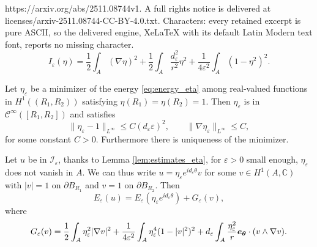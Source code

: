 \documentclass[10pt,a4paper]{amsart}
\def \p {\partial}
\def\C{{\mathcal C}}
\def\I{{\mathcal I}}
\def\e {{\varepsilon}}
\renewcommand{\vec}[1]{\text{\boldmath $#1$}}
\begin{document}
https://arxiv.org/abs/2511.08744v1. A full rights notice is delivered at licenses/arxiv-2511.08744-CC-BY-4.0.txt. Characters: every retained excerpt is pure ASCII, so the delivered engine, XeLaTeX with its default Latin Modern text font, reports no missing character.
\begin{equation}\label{eq:energy_eta}
I_\e (\eta) =\frac12 \int_A (\nabla \eta)^2+\frac12 \int_A \frac{d_\e^2}{r^2} \eta^2+\frac{1}{4\e^2}\int_A (1-\eta^2)^2.
\end{equation}

\begin{lemma}\label{lem:estimates_eta}
Let \(\eta_\e\) be a minimizer of the energy \eqref{eq:energy_eta} among real-valued functions in \(H^1((R_1,R_2))\) satisfying \(\eta(R_1)=\eta(R_2)=1\). Then \(\eta_\e\) is in \(\C^\infty([R_1,R_2])\) and satisfies
\begin{equation}\label{eq:estimate_eta}
\|\eta_\e-1\|_{L^\infty}\leq C(d_\e\e)^2, \quad \quad \| \nabla \eta_\e\|_{L^\infty}\leq C,
\end{equation}
for some constant \(C>0\). Furthermore there is uniqueness of the minimizer.
\end{lemma}

\begin{lemma}\label{lem:decomposition_energy} 
Let \(u\) be in \(\I_\e\), thanks to Lemma \ref{lem:estimates_eta}, for \(\e>0\) small enough, \(\eta_\e\) does not vanish in \(A\). We can thus write \(u=\eta_\e e^{id_\e\theta} v\) for some \(v\in H^1(A,\mathbb{C})\) with \(|v|=1\) on \(\p B_{R_1}\) and \(v=1\) on \(\p B_{R_2}\). Then
\begin{equation}\label{eq:splittinh}
E_\e(u)=E_\e(\eta_\e e^{id_\e \theta})+G_\e(v),
\end{equation} 
where 
\begin{equation*}
G_\e(v)=\frac12 \int_A \eta_\e^2 |\nabla v|^2+\frac{1}{4\e^2}\int_A \eta_\e^4 (1-|v|^2)^2 +d_\e\int_A \frac{\eta_\e^2}{r}\vec{e_\theta}\cdot (v\wedge \nabla v).
\end{equation*}
\end{lemma}
\end{document}
